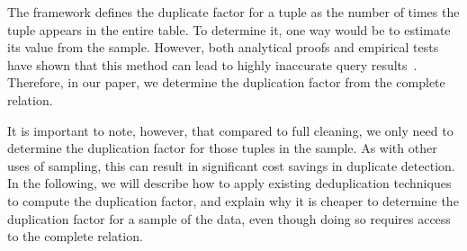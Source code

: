 
\fi

The \saqpplus framework defines the duplicate factor for a tuple as the number of times the tuple appears in the entire table. To determine it, one way would be to estimate its value from the sample. However, both analytical proofs and empirical tests have shown that this method can lead to highly inaccurate query results~\cite{charikar2000towards}.
Therefore, in our paper, we determine the duplication factor from the complete relation. 

It is important to note, however, that compared to full cleaning, we only need to determine the duplication factor for those tuples in the sample. As with other uses of sampling, this can result in significant cost savings in duplicate detection.
In the following, we will describe how to apply existing deduplication techniques to compute the duplication factor, and explain why it is cheaper to determine the duplication factor for a sample of the data, even though doing so requires access to the complete relation.


